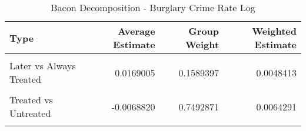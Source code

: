 \begin{table}[H]

\caption{\label{tab:tab:bacondecompositionBurglary}Bacon Decomposition - Burglary Crime Rate Log}
\centering
\begin{tabular}[t]{lrrr}
\toprule
Type & Average Estimate & Group Weight & Weighted Estimate\\
\midrule
\cellcolor{gray!6}{Earlier vs Later Treated} & \cellcolor{gray!6}{-0.0146061} & \cellcolor{gray!6}{0.0683810} & \cellcolor{gray!6}{-0.0023226}\\
Later vs Always Treated & 0.0169005 & 0.1589397 & 0.0048413\\
\cellcolor{gray!6}{Later vs Earlier Treated} & \cellcolor{gray!6}{-0.0157802} & \cellcolor{gray!6}{0.0233921} & \cellcolor{gray!6}{-0.0013013}\\
Treated vs Untreated & -0.0068820 & 0.7492871 & 0.0064291\\
\cellcolor{gray!6}{Total TWFE} & \cellcolor{gray!6}{NaN} & \cellcolor{gray!6}{NaN} & \cellcolor{gray!6}{0.0076465}\\
\bottomrule
\end{tabular}
\end{table}
